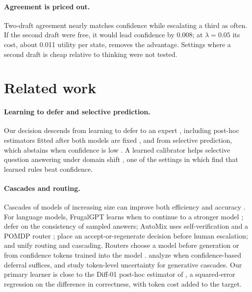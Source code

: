 \documentclass[10pt,letterpaper]{article}
\newcommand{\lam}{\lambda}
\begin{document}
\paragraph{Agreement is priced out.} Two-draft agreement nearly matches confidence while escalating a third as often. If the second draft were free, it would lead confidence by 0.008; at $\lam=0.05$ its cost, about 0.011 utility per state, removes the advantage. Settings where a second draft is cheap relative to thinking were not tested.

\section{Related work}
\label{sec:related}

\paragraph{Learning to defer and selective prediction.} Our decision descends from learning to defer to an expert \citep{madras2018defer,mozannar2020defer}, including post-hoc estimators fitted after both models are fixed \citep{narasimhan2022posthoc}, and from selective prediction, which abstains when confidence is low \citep{geifman2017selective}. A learned calibrator helps selective question answering under domain shift \citep{kamath2020selective}, one of the settings in which \citet{jitkrittum2023cascade} find that learned rules beat confidence.

\paragraph{Cascades and routing.} Cascades of models of increasing size can improve both efficiency and accuracy \citep{wang2022committees,varshney2022cascading}. For language models, FrugalGPT learns when to continue to a stronger model \citep{chen2023frugalgpt}; \citet{yue2024motcascade} defer on the consistency of sampled answers; AutoMix uses self-verification and a POMDP router \citep{aggarwal2024automix}; \citet{fanconi2025cascaded} place an accept-or-regenerate decision before human escalation; and \citet{dekoninck2024cascaderouting} unify routing and cascading. Routers choose a model before generation \citep{ding2024hybridllm,ong2024routellm} or from confidence tokens trained into the model \citep{chuang2024confidencetokens}. \citet{jitkrittum2023cascade} analyze when confidence-based deferral suffices, and \citet{gupta2024lmcascades} study token-level uncertainty for generative cascades. Our primary learner is close to the Diff-01 post-hoc estimator of \citet{jitkrittum2023cascade}, a squared-error regression on the difference in correctness, with token cost added to the target.
\end{document}
